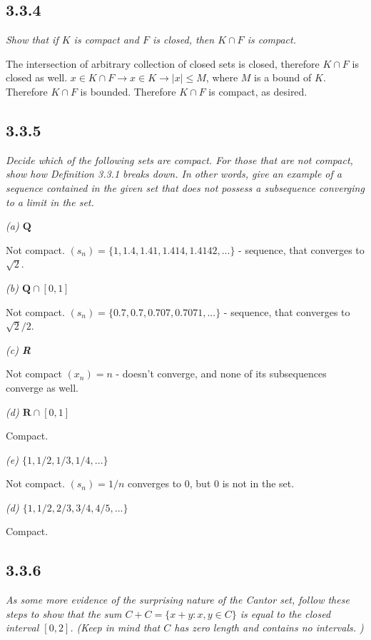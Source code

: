 \documentclass[11pt,oneside,titlepage]{book}
\begin{document}
\subsection*{3.3.4}
\textit{Show that if $K$ is compact and $F$ is closed, then $K \cap F$ is
  compact.}

The intersection of arbitrary  collection of closed sets is closed,
therefore $K \cap F$ is closed as well.
$x \in K \cap F \to x \in K \to |x| \leq M$, where $M$ is a bound of $K$.
Therefore $K \cap  F $ is bounded. Therefore $K \cap F$ is compact, as desired.

\subsection*{3.3.5}
\textit{Decide which of the following sets are compact. For those that are not compact,
  show how Definition 3.3.1 breaks down. In other words, give an example of a sequence
  contained in the given set that does not possess
  a subsequence converging to a limit in the set.}

\textit{(a) $\textbf{Q}$}

Not compact. $(s_n) = \{1, 1.4, 1.41, 1.414, 1.4142, ... \}$ - sequence, that
converges to $\sqrt{2}$.

\textit{(b) $\textbf{Q} \cap [0, 1]$}

Not compact. $(s_n) = \{0.7, 0.7, 0.707, 0.7071, ... \}$ - sequence, that
converges to $\sqrt{2} / 2$.

\textit{(c) \textbf{R}}

Not compact $(x_n) = n$ - doesn't converge, and none of its subsequences
converge as well.

\textit{(d) $\textbf{R} \cap [0,1]$}

Compact.

\textit{(e) $\{1, 1/2, 1/3, 1/4,...\}$}

Not compact. $(s_n) = 1/n$ converges to 0, but 0 is not in the set.

\textit{(d)  $\{1, 1/2, 2/3, 3/4, 4/5,...\}$}

Compact.

\subsection*{3.3.6}
\textit{As some more evidence of the surprising nature of the Cantor set,
  follow these steps  to show that the sum $C + C = \{x + y: x,y \in C\}$ is
  equal to the closed interval $[0,2]$. (Keep in mind that $C$ has zero length
  and contains no intervals. )}
\end{document}
